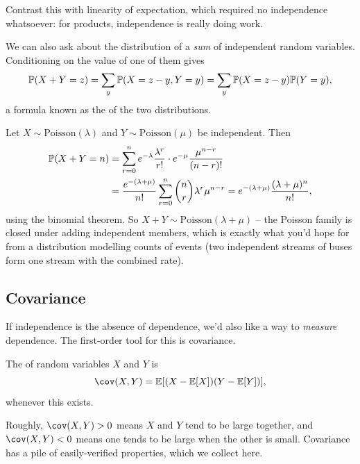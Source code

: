 \documentclass[a4paper]{scrartcl}
\begin{document}
Contrast this with linearity of expectation, which required no independence whatsoever: for products, independence is really doing work.

We can also ask about the distribution of a \emph{sum} of independent random variables. Conditioning on the value of one of them gives
$$
\mathbb{P}(X + Y = z) = \sum_y \mathbb{P}(X = z - y, Y = y) = \sum_{y} \mathbb{P}(X = z - y)\mathbb{P}(Y = y),
$$
a formula known as the  of the two distributions.

\begin{example}
	Let $X \sim \mathrm{Poisson}(\lambda)$ and $Y \sim \mathrm{Poisson}(\mu)$ be independent. Then
	\begin{align*}
		\mathbb{P}(X + Y = n) &= \sum_{r = 0}^{n} e^{-\lambda}\frac{\lambda^r}{r!} \cdot e^{-\mu}\frac{\mu^{n - r}}{(n-r)!} \\
		&= \frac{e^{-(\lambda + \mu)}}{n!} \sum_{r = 0}^{n} \binom{n}{r}\lambda^r \mu^{n - r} = e^{-(\lambda + \mu)}\frac{(\lambda + \mu)^n}{n!},
	\end{align*}
	using the binomial theorem. So $X + Y \sim \mathrm{Poisson}(\lambda + \mu)$ -- the Poisson family is closed under adding independent members, which is exactly what you'd hope for from a distribution modelling counts of events (two independent streams of buses form one stream with the combined rate).
\end{example}

\subsection{Covariance}

If independence is the absence of dependence, we'd also like a way to \emph{measure} dependence. The first-order tool for this is covariance.

\begin{definition}[Covariance]
	The  of random variables $X$ and $Y$ is
	$$
	\cov(X, Y) = \EE[(X - \EE[X])(Y - \EE[Y])],
	$$
	whenever this exists.
\end{definition}

Roughly, $\cov(X, Y) > 0$ means $X$ and $Y$ tend to be large together, and $\cov(X, Y) < 0$ means one tends to be large when the other is small. Covariance has a pile of easily-verified properties, which we collect here.
\end{document}
